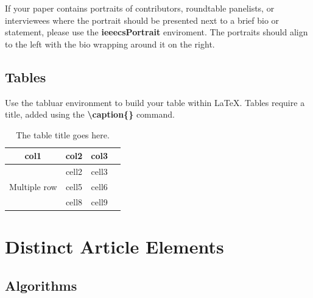\documentclass{csmagazine}
\begin{document}
If your paper contains portraits of contributors, roundtable panelists, or interviewees where the portrait should be presented next to a brief bio or statement, please use the \textbf{ieeecsPortrait} enviroment. The portraits should align to the left with the bio wrapping around it on the right.


\vspace{6em}


\subsection{Tables}

Use the tabluar environment to build your table within \LaTeX. Tables require a title, added using the \textbf{\textbackslash{}caption\{\}} command.



\begin{table}[H]
	\begin{center}
		\caption{The table title goes here.}
		\begin{tabular}{ |c|c|c|c| } 
			\hline
			col1 & col2 & col3 \\
			\hline
			\multirow{3}{4em}{Multiple row} & cell2 & cell3 \\ 
			& cell5 & cell6 \\ 
			& cell8 & cell9 \\ 
			\hline
		\end{tabular}
	\end{center}
\end{table}

\pagebreak



\section{Distinct Article Elements}

\subsection{Algorithms}
\end{document}
